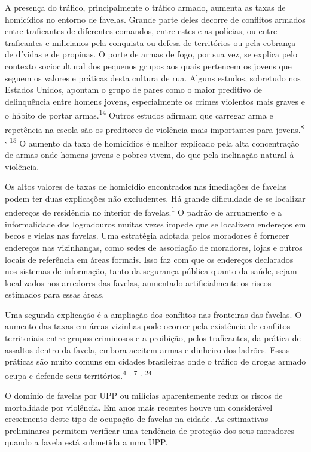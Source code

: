 \documentclass{article}
\begin{document}
A presença do tráfico, principalmente o tráfico armado, aumenta as taxas de
homicídios no entorno de favelas. Grande parte deles decorre de conflitos
armados entre traficantes de diferentes comandos, entre estes e as polícias, ou
entre traficantes e milicianos pela conquista ou defesa de territórios ou pela
cobrança de dívidas e de propinas. O porte de armas de fogo, por sua vez, se
explica pelo contexto sociocultural dos pequenos grupos aos quais pertencem os
jovens que seguem os valores e práticas desta cultura de rua. Alguns estudos,
sobretudo nos Estados Unidos, apontam o grupo de pares como o maior preditivo de
delinquência entre homens jovens, especialmente os crimes violentos mais graves
e o hábito de portar armas.\textsuperscript{14}
Outros estudos afirmam que carregar arma e repetência na escola são os
preditores de violência mais importantes para jovens.\textsuperscript{8}
\textsuperscript{,}
\textsuperscript{15}
O aumento da taxa de homicídios é melhor explicado pela alta concentração de
armas onde homens jovens e pobres vivem, do que pela inclinação natural à
violência.

Os altos valores de taxas de homicídio encontrados nas imediações de favelas
podem ter duas explicações não excludentes. Há grande dificuldade de se
localizar endereços de residência no interior de favelas.\textsuperscript{1}
O padrão de arruamento e a informalidade dos logradouros muitas vezes impede que
se localizem endereços em becos e vielas nas favelas. Uma estratégia adotada
pelos moradores é fornecer endereços nas vizinhanças, como sedes de associação
de moradores, lojas e outros locais de referência em áreas formais. Isso faz com
que os endereços declarados nos sistemas de informação, tanto da segurança
pública quanto da saúde, sejam localizados nos arredores das favelas, aumentado
artificialmente os riscos estimados para essas áreas.

Uma segunda explicação é a ampliação dos conflitos nas fronteiras das favelas. O
aumento das taxas em áreas vizinhas pode ocorrer pela existência de conflitos
territoriais entre grupos criminosos e a proibição, pelos traficantes, da
prática de assaltos dentro da favela, embora aceitem armas e dinheiro dos
ladrões. Essas práticas são muito comuns em cidades brasileiras onde o tráfico
de drogas armado ocupa e defende seus territórios.\textsuperscript{4}
\textsuperscript{,}
\textsuperscript{7}
\textsuperscript{,}
\textsuperscript{24}

O domínio de favelas por UPP ou milícias aparentemente reduz os riscos de
mortalidade por violência. Em anos mais recentes houve um considerável
crescimento deste tipo de ocupação de favelas na cidade. As estimativas
preliminares permitem verificar uma tendência de proteção dos seus moradores
quando a favela está submetida a uma UPP.
\end{document}
